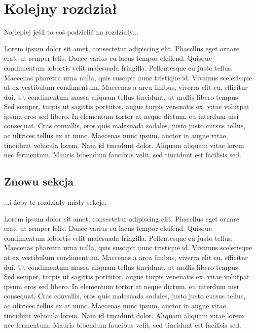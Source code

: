 \chapter{Kolejny rozdział}

Najlepiej jeśli to coś podzielić na rozdziały...

Lorem ipsum dolor sit amet, consectetur adipiscing elit. Phasellus eget ornare
erat, ut semper felis. Donec varius eu lacus tempor eleifend. Quisque
condimentum lobortis velit malesuada fringilla. Pellentesque eu justo tellus.
Maecenas pharetra urna nulla, quis suscipit nunc tristique id. Vivamus
scelerisque at ex vestibulum condimentum. Maecenas a arcu finibus, viverra elit
eu, efficitur dui. Ut condimentum massa aliquam tellus tincidunt, ut mollis
libero tempus. Sed semper, turpis ut sagittis porttitor, augue turpis venenatis
ex, vitae volutpat ipsum eros sed libero. In elementum tortor at neque dictum,
eu interdum nisi consequat. Cras convallis, eros quis malesuada sodales, justo
justo cursus tellus, ac ultrices tellus ex at nunc. Maecenas nunc ipsum, auctor
in augue vitae, tincidunt vehicula lorem. Nam id tincidunt dolor. Aliquam
aliquam vitae lorem nec fermentum. Mauris bibendum faucibus velit, sed tincidunt
est facilisis sed.

\section{Znowu sekcja}

...i żeby te rozdziały miały sekcje.

Lorem ipsum dolor sit amet, consectetur adipiscing elit. Phasellus eget ornare
erat, ut semper felis. Donec varius eu lacus tempor eleifend. Quisque
condimentum lobortis velit malesuada fringilla. Pellentesque eu justo tellus.
Maecenas pharetra urna nulla, quis suscipit nunc tristique id. Vivamus
scelerisque at ex vestibulum condimentum. Maecenas a arcu finibus, viverra elit
eu, efficitur dui. Ut condimentum massa aliquam tellus tincidunt, ut mollis
libero tempus. Sed semper, turpis ut sagittis porttitor, augue turpis venenatis
ex, vitae volutpat ipsum eros sed libero. In elementum tortor at neque dictum,
eu interdum nisi consequat. Cras convallis, eros quis malesuada sodales, justo
justo cursus tellus, ac ultrices tellus ex at nunc. Maecenas nunc ipsum, auctor
in augue vitae, tincidunt vehicula lorem. Nam id tincidunt dolor. Aliquam
aliquam vitae lorem nec fermentum. Mauris bibendum faucibus velit, sed tincidunt
est facilisis sed.
